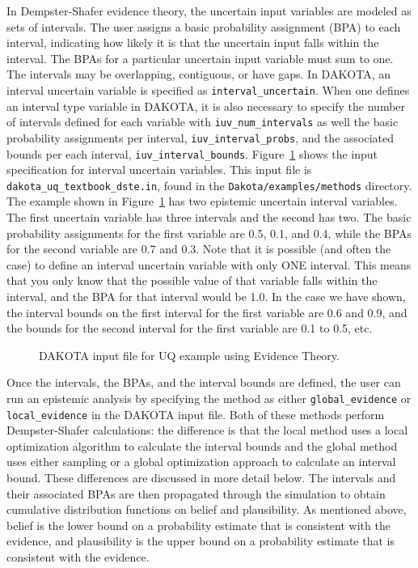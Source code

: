 In Dempster-Shafer evidence theory, the uncertain input variables are
modeled as sets of intervals.  The user assigns a basic probability
assignment (BPA) to each interval, indicating how likely it is that
the uncertain input falls within the interval.  The BPAs for a
particular uncertain input variable must sum to one.  The intervals
may be overlapping, contiguous, or have gaps. In DAKOTA, an interval
uncertain variable is specified as \texttt{interval\_uncertain}.  When
one defines an interval type variable in DAKOTA, it is also necessary
to specify the number of intervals defined for each variable with
\texttt{iuv\_num\_intervals} as well the basic probability assignments
per interval, \texttt{iuv\_interval\_probs}, and the associated bounds
per each interval, \texttt{iuv\_interval\_bounds}. 
Figure~\ref{uq:figure16} shows the input specification for interval
uncertain variables. This input file is \texttt{dakota\_uq\_textbook\_dste.in}, found in the \texttt{Dakota/examples/methods} 
directory.   The example shown in Figure~\ref{uq:figure16}
has two epistemic uncertain interval variables.  
The first uncertain
variable has three intervals and the second has two. The basic
probability assignments for the first variable are 0.5, 0.1, and 0.4,
while the BPAs for the second variable are 0.7 and 0.3. Note that it
is possible (and often the case) to define an interval uncertain
variable with only ONE interval.  This means that you only know that
the possible value of that variable falls within the interval, and the
BPA for that interval would be 1.0.  In the case we have shown, the
interval bounds on the first interval for the first variable are 0.6
and 0.9, and the bounds for the second interval for the first variable
are 0.1 to 0.5, etc.

\begin{figure}
  \centering
  \begin{bigbox}
    \begin{small}
    \end{small}
  \end{bigbox}
\caption{DAKOTA input file for UQ example using Evidence Theory.}
\label{uq:figure16}
\end{figure}

Once the intervals, the BPAs, and the interval bounds are defined, 
the user can run an epistemic analysis by specifying the method as 
either \texttt{global\_evidence} or 
\texttt{local\_evidence} in the DAKOTA input file.  
Both of these methods perform Dempster-Shafer calculations:  
the difference is that the local method uses a local optimization 
algorithm to calculate the interval bounds and the global 
method uses either sampling or a global optimization approach to 
calculate an interval bound.  These differences are discussed in 
more detail below. 
The intervals and their associated BPAs are then propagated through
the simulation to obtain cumulative distribution functions on belief
and plausibility.  As mentioned above, belief is the lower bound on a
probability estimate that is consistent with the evidence, and
plausibility is the upper bound on a probability estimate that is
consistent with the evidence.  

